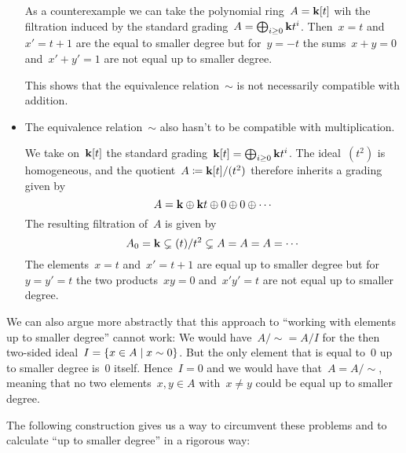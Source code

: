 \begin{remark}
\begin{itemize}
      As a counterexample we can take the polynomial ring~$A = \mathbf{k}[t]$ wih the filtration induced by the standard grading~$A = \bigoplus_{i \geq 0} \mathbf{k} t^i$.
      Then~$x = t$ and~$x' = t+1$ are the equal to smaller degree but for~$y = -t$ the sums~$x + y = 0$ and~$x' + y' = 1$ are not equal up to smaller degree.
      
      This shows that the equivalence relation~$\sim$ is not necessarily compatible with addition.
    \item
      The equivalence relation~$\sim$ also hasn’t to be compatible with multiplication.
      
      We take on~$\mathbf{k}[t]$ the standard grading~$\mathbf{k}[t] = \bigoplus_{i \geq 0} \mathbf{k} t^i$.
      The ideal~$(t^2)$ is homogeneous, and the quotient~$A \coloneqq \mathbf{k}[t]/(t^2)$ therefore inherits a grading given by
      \[
        A
        =
        \mathbf{k}
        \oplus
        \mathbf{k} t
        \oplus
        0
        \oplus
        0
        \oplus
        \dotsb
      \]
      The resulting filtration of~$A$ is given by
      \[
        A_0
        =
        \mathbf{k}
        \subsetneq
        (t)/t^2
        \subsetneq
        A
        =
        A
        =
        A
        =
        \dotsb
      \]
      The elements~$x = t$ and~$x' = t+1$ are equal up to smaller degree but for~$y = y' = t$ the two products~$xy = 0$ and~$x' y' = t$ are not equal up to smaller degree.
  \end{itemize}
  We can also argue more abstractly that this approach to \enquote{working with elements up to smaller degree} cannot work:
  We would have~$A/{\sim} = A/I$ for the then two-sided ideal~$I = \{x \in A \suchthat x \sim 0\}$.
  But the only element that is equal to~$0$ up to smaller degree is~$0$ itself.
  Hence~$I = 0$ and we would have that~$A = A/{\sim}$, meaning that no two elements~$x, y \in A$ with~$x \neq y$ could be equal up to smaller degree.
  
  The following construction gives us a way to circumvent these problems and to calculate \enquote{up to smaller degree} in a rigorous way:
\end{remark}


